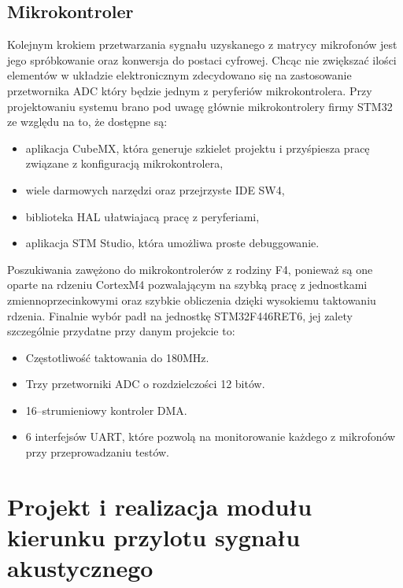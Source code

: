 \documentclass[eng,printmode]{mgr}
\begin{document}
\section{Mikrokontroler}
Kolejnym krokiem przetwarzania sygnału uzyskanego z matrycy mikrofonów jest jego spróbkowanie oraz konwersja do postaci cyfrowej. 
Chcąc nie zwiększać ilości elementów w układzie elektronicznym zdecydowano się na zastosowanie przetwornika ADC który będzie jednym z peryferiów mikrokontrolera. Przy projektowaniu systemu brano pod uwagę głównie mikrokontrolery firmy STM32 ze względu na to, że dostępne są:
\begin{itemize}
\item aplikacja CubeMX, która generuje szkielet projektu i przyśpiesza pracę związane z konfiguracją mikrokontrolera,
\item wiele darmowych narzędzi oraz przejrzyste IDE SW4,
\item biblioteka HAL ułatwiajacą pracę z peryferiami,
\item aplikacja STM Studio, która umożliwa proste debuggowanie.
\end{itemize} 
Poszukiwania zawężono do mikrokontrolerów z rodziny F4, ponieważ są one oparte na rdzeniu CortexM4 pozwalającym na szybką pracę z jednostkami zmiennoprzecinkowymi oraz szybkie obliczenia dzięki wysokiemu taktowaniu rdzenia. Finalnie wybór padł na jednostkę STM32F446RET6, jej zalety szczególnie przydatne przy danym projekcie to:
\begin{itemize}
\item Częstotliwość taktowania do 180MHz.
\item Trzy przetworniki ADC o rozdzielczości 12 bitów.
\item 16--strumieniowy kontroler DMA.
\item 6 interfejsów UART, które pozwolą na monitorowanie każdego z mikrofonów przy przeprowadzaniu testów.
\end{itemize} 
\chapter{Projekt i realizacja modułu
 kierunku przylotu sygnału akustycznego}
 
\end{document}
